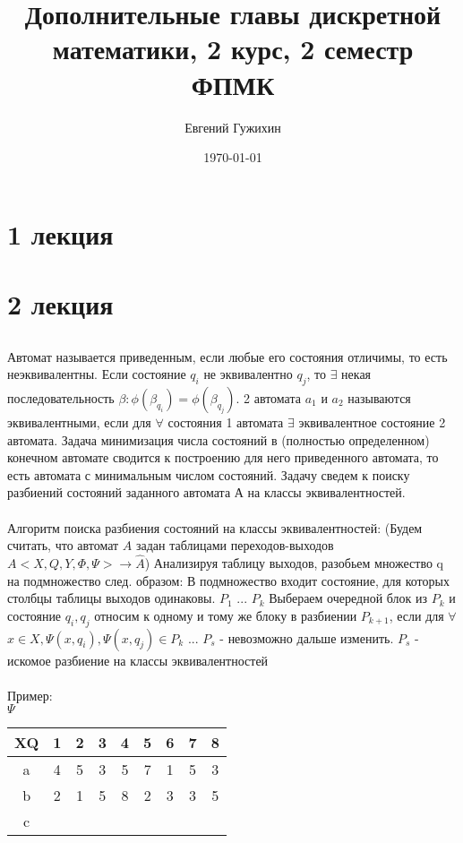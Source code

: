 \documentclass[a5paper,10pt]{article}
\author{Евгений Гужихин}
\title{Дополнительные главы дискретной математики, 2 курс, 2 семестр ФПМК}
\date{\today}
\begin{document}
	\maketitle
	\tableofcontents{}
	\newpage

	\section{1 лекция}

	\section{2 лекция}
		\subsection{}
			\paragraph{}
				Автомат называется приведенным, если любые его состояния отличимы, то есть неэквивалентны.
				Если состояние $q_i$ не эквивалентно $q_j$, то $\exists$ некая последовательность $\beta: \phi(\beta_{q_i})=\phi(\beta_{q_j})$.
				2 автомата $a_1$ и $a_2$ называются эквивалентными, если для $\forall$ состояния 1 автомата $\exists$ эквивалентное состояние 2 автомата.
				Задача минимизация числа состояний в (полностью определенном) конечном автомате сводится к построению для него приведенного автомата, то есть автомата с минимальным числом состояний.
				Задачу сведем к поиску разбиений состояний заданного автомата А на классы эквивалентностей.

			\paragraph{}
				Алгоритм поиска разбиения состояний на классы эквивалентностей:
				(Будем считать, что автомат $A$ задан таблицами переходов-выходов
				$ A<X,Q,Y,\Phi,\Psi> \rightarrow \hat A $)
				Анализируя таблицу выходов, разобьем множество q на подмножество след. образом:
					В подмножество входит состояние, для которых столбцы таблицы выходов одинаковы.
					$P_1$
					...
					$P_k$
					Выбераем очередной блок из $P_k$ и состояние $q_i, q_j$ относим к одному и тому же блоку в разбиении $P_{k+1}$, если для $\forall$ $x \in X, \Psi(x,q_i),\Psi(x,q_j) \in P_k$
					...
					$P_s$ - невозможно дальше изменить. $P_s$ - искомое разбиение на классы эквивалентностей

			\paragraph{}
				Пример: \\
				$\Psi$
				\begin{tabular}{*{9}{c}}
					XQ & 1 & 2 & 3 & 4 & 5 & 6 & 7 & 8 \\
					\hline
					a & 4 & 5 & 3 & 5 & 7 & 1 & 5 & 3 \\
					b & 2 & 1 & 5 & 8 & 2 & 3 & 3 & 5 \\
					c & & & & & & & & \\
				\end{tabular} \\
\end{document}
